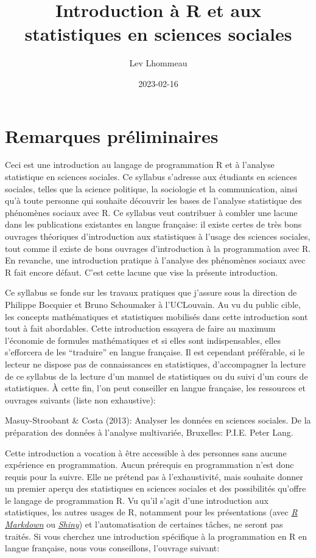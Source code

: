 \documentclass[
]{book}
\title{Introduction à R et aux statistiques en sciences sociales}
\author{Lev Lhommeau}
\date{2023-02-16}
\begin{document}
\maketitle

{
\setcounter{tocdepth}{1}
\tableofcontents
}
\hypertarget{remarques-pruxe9liminaires}{%
\chapter{Remarques préliminaires}\label{remarques-pruxe9liminaires}}

Ceci est une introduction au langage de programmation R et à l'analyse statistique en sciences sociales. Ce syllabus s'adresse aux étudiants en sciences sociales, telles que la science politique, la sociologie et la communication, ainsi qu'à toute personne qui souhaite découvrir les bases de l'analyse statistique des phénomènes sociaux avec R. Ce syllabus veut contribuer à combler une lacune dans les publications existantes en langue française: il existe certes de très bons ouvrages théoriques d'introduction aux statistiques à l'usage des sciences sociales, tout comme il existe de bons ouvrages d'introduction à la programmation avec R. En revanche, une introduction pratique à l'analyse des phénomènes sociaux avec R fait encore défaut. C'est cette lacune que vise la présente introduction.

Ce syllabus se fonde sur les travaux pratiques que j'assure sous la direction de Philippe Bocquier et Bruno Schoumaker à l'UCLouvain. Au vu du public cible, les concepts mathématiques et statistiques mobilisés dans cette introduction sont tout à fait abordables. Cette introduction essayera de faire au maximum l'économie de formules mathématiques et si elles sont indispensables, elles s'efforcera de les ``traduire'' en langue française. Il est cependant préférable, si le lecteur ne dispose pas de connaissances en statistiques, d'accompagner la lecture de ce syllabus de la lecture d'un manuel de statistiques ou du suivi d'un cours de statistiques. À cette fin, l'on peut conseiller en langue française, les ressources et ouvrages suivants (liste non exhaustive):

Masuy-Stroobant \& Costa (2013): Analyser les données en sciences sociales. De la préparation des données à l'analyse multivariée, Bruxelles: P.I.E. Peter Lang.

Cette introduction a vocation à être accessible à des personnes sans aucune expérience en programmation. Aucun prérequis en programmation n'est donc requis pour la suivre. Elle ne prétend pas à l'exhaustivité, mais souhaite donner un premier aperçu des statistiques en sciences sociales et des possibilités qu'offre le langage de programmation R. Vu qu'il s'agit d'une introduction aux statistiques, les autres usages de R, notamment pour les présentations (avec \href{https://rmarkdown.rstudio.com/}{\emph{R Markdown}} ou \href{https://shiny.rstudio.com/}{\emph{Shiny}}) et l'automatisation de certaines tâches, ne seront pas traités. Si vous cherchez une introduction spécifique à la programmation en R en langue française, nous vous conseillons, l'ouvrage suivant:
\end{document}
